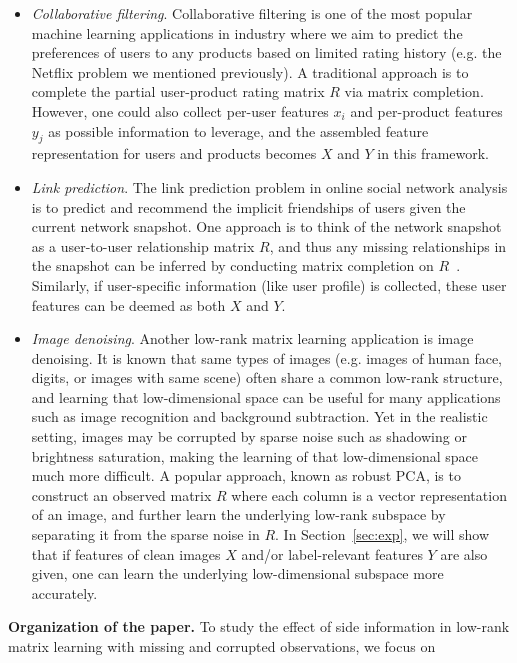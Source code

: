 \documentclass[twoside,11pt]{article}
\begin{document}
\begin{itemize}
  \item {\it Collaborative filtering}.  Collaborative filtering is one of the most popular
    machine learning applications in industry where we aim to predict the preferences
    of users to any products based on limited rating history (e.g. the Netflix problem we
    mentioned previously).
    A traditional approach is to complete the partial
    user-product rating matrix $R$ via matrix completion.  However, one could also
    collect per-user features $x_i$ and per-product features $y_j$ as possible information
    to leverage, and the assembled
    feature representation for users and products becomes $X$ and $Y$ in this framework.
  \item {\it Link prediction}.  The link prediction problem in online social network analysis
    is to predict and recommend the implicit friendships of users given the current network
    snapshot.  One approach is to think of the network snapshot as a user-to-user relationship
    matrix $R$, and thus any missing relationships in the snapshot can be inferred by
    conducting matrix completion on $R$~\citep{Nowell07a}.
    Similarly, if user-specific
    information (like user profile) is collected, these user features can be
    deemed as both $X$ and $Y$.
  \item {\it Image denoising}.  Another low-rank matrix learning application is image
    denoising.  It is known that same types of images (e.g. images of human face, digits, or
    images with same scene) often share a common low-rank structure, and learning that
    low-dimensional space can be useful for many applications such as image recognition
    and background subtraction.  Yet
    in the realistic setting, images may be corrupted by sparse noise
    such as shadowing or brightness saturation, making the learning of that low-dimensional
    space much more difficult.  A popular approach, known as robust PCA, is
    to construct an observed matrix $R$ where each column is a vector
    representation of an image, and further learn the
    underlying low-rank subspace by separating it from the sparse noise in $R$.
    In Section~\ref{sec:exp}, we will show that if features of clean images $X$ and/or
    label-relevant features $Y$ are also given, one can learn the underlying
    low-dimensional subspace more accurately.
\end{itemize}
{\noindent \bf Organization of the paper.}
To study the effect of side information in low-rank
matrix learning with missing and corrupted observations, we focus on
\end{document}
